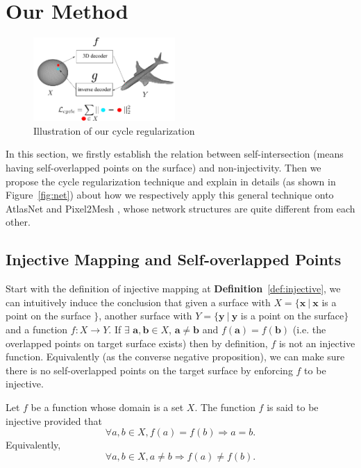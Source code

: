 \section{Our Method}
\begin{figure}
	\vspace{-20pt}
	\begin{center}
		\includegraphics[width=0.48\textwidth]{img/net/cycle}
	\end{center}
	\caption{Illustration of our cycle regularization}
	\label{fig:cycle}
\end{figure}
In this section, we firstly establish the relation between self-intersection (means having self-overlapped points on the surface) and non-injectivity.  
Then we propose the cycle regularization technique and explain in details (as shown in Figure~\ref{fig:net}) about how we respectively apply this general technique onto AtlasNet \cite{atlasnet} and Pixel2Mesh \cite{pixel2mesh}, whose network structures are quite different from each other.

\subsection{Injective Mapping and Self-overlapped Points}
\label{subsec:inj}
Start with the definition of injective mapping at \textbf{Definition}~\ref{def:injective}, we can intuitively induce the conclusion that given a surface with $ X =\{\mathbf{x}~|~\mathbf{x}$ is a point on the surface $ \} $, another surface with $ Y =\{\mathbf{y}~|~\mathbf{y}$ is a point on the surface$ \} $ and a function $f:X \rightarrow Y$. If $\exists$ $ \mathbf{a},\mathbf{b} \in X$, $\mathbf{a} \neq \mathbf{b}$ and $f(\mathbf{a}) = f(\mathbf{b})$ (i.e. the overlapped points on target surface exists) then by definition, $f$ is not an injective function. Equivalently (as the converse negative proposition), we can make sure there is no self-overlapped points on the target surface by enforcing $f$ to be injective.
\begin{m_def}
\label{def:injective}
Let $f$ be a function whose domain is a set $X$. The function $f$ is said to be injective provided that
\begin{equation}
\forall a,b \in X, f(a) = f(b) \Rightarrow a = b.
\end{equation}
Equivalently, 
\begin{equation}
\forall a,b \in X, a \neq b \Rightarrow f(a) \neq f(b).
\end{equation}
\end{m_def}

